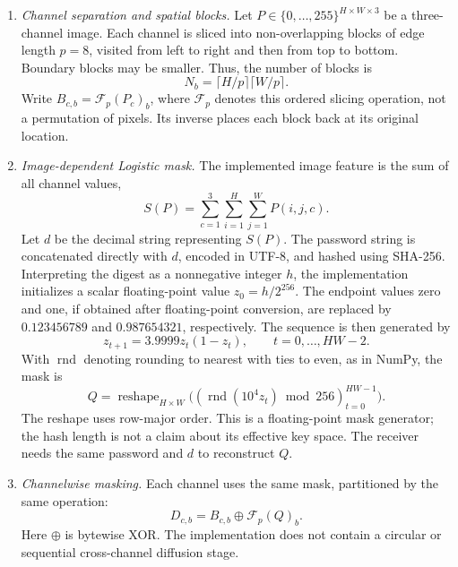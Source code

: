 \documentclass[a4paper,fleqn]{cas-sc}
\theoremstyle{plain}
\theoremstyle{definition}
\begin{document}
\begin{enumerate}
\item \textit{Channel separation and spatial blocks.}
Let $P\in\{0,\ldots,255\}^{H\times W\times 3}$ be a three-channel image. Each channel is sliced into non-overlapping blocks of edge length $p=8$, visited from left to right and then from top to bottom. Boundary blocks may be smaller. Thus, the number of blocks is
\begin{equation}
N_b=\lceil H/p\rceil\lceil W/p\rceil.
\end{equation}
Write $B_{c,b}=\mathcal F_p(P_c)_b$, where $\mathcal F_p$ denotes this ordered slicing operation, not a permutation of pixels. Its inverse places each block back at its original location.

\item \textit{Image-dependent Logistic mask.}
The implemented image feature is the sum of all channel values,
\begin{equation}
S(P)=\sum_{c=1}^{3}\sum_{i=1}^{H}\sum_{j=1}^{W}P(i,j,c).
\end{equation}
Let $d$ be the decimal string representing $S(P)$. The password string is concatenated directly with $d$, encoded in UTF-8, and hashed using SHA-256. Interpreting the digest as a nonnegative integer $h$, the implementation initializes a scalar floating-point value $z_0=h/2^{256}$. The endpoint values zero and one, if obtained after floating-point conversion, are replaced by $0.123456789$ and $0.987654321$, respectively. The sequence is then generated by
\begin{equation}
z_{t+1}=3.9999z_t(1-z_t),\qquad t=0,\ldots,HW-2.
\end{equation}
With $\operatorname{rnd}$ denoting rounding to nearest with ties to even, as in NumPy, the mask is
\begin{equation}
Q=\operatorname{reshape}_{H\times W}
\bigl((\operatorname{rnd}(10^4z_t)\bmod256)_{t=0}^{HW-1}\bigr).
\end{equation}
The reshape uses row-major order. This is a floating-point mask generator; the hash length is not a claim about its effective key space. The receiver needs the same password and $d$ to reconstruct $Q$.

\item \textit{Channelwise masking.}
Each channel uses the same mask, partitioned by the same operation:
\begin{equation}
D_{c,b}=B_{c,b}\oplus\mathcal F_p(Q)_b.
\end{equation}
Here $\oplus$ is bytewise XOR. The implementation does not contain a circular or sequential cross-channel diffusion stage.


\end{enumerate}
\end{document}
